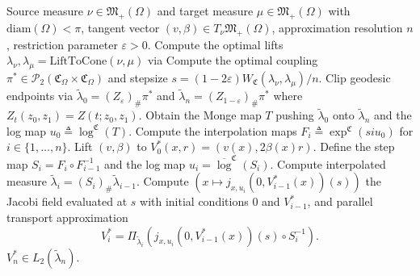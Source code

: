 \documentclass[11pt]{article}
\begin{document}
\begin{algorithm}[h]
    \begin{algorithmic}[1]
        \caption{Approximate Parallel transport on $(\mathfrak{M}_+(\Omega), \text{HK})$}
        \label{alg: HK parallel transport}
        \Require Source measure $\nu \in \mathfrak{M}_+(\Omega)$ and target measure $\mu \in \mathfrak{M}_+(\Omega)$ with $\text{diam}(\Omega) < \pi$, tangent vector $(v, \beta) \in T_{\nu}\mathfrak{M}_+(\Omega)$, approximation resolution $n$, restriction parameter $\varepsilon >0$.  
        \State Compute the optimal lifts $\lambda_{\nu}, \lambda_{\mu} = \text{LiftToCone}(\nu, \mu)$ via 
        \State Compute the optimal coupling $\pi^* \in \mathcal{P}_2(\mathfrak{C}_{\Omega} \times \mathfrak{C}_{\Omega})$ and stepsize $s = (1-2\varepsilon)W_\mathfrak{C}(\lambda_\nu, \lambda_\mu)/n.$
        \State Clip geodesic endpoints via $\tilde{\lambda}_0 = (Z_{\varepsilon})_{\#}\pi^*$ and $\tilde{\lambda}_n = (Z_{1 - \varepsilon})_{\#}\pi^*$ where $Z_t(z_0, z_1) = Z(t; z_0, z_1)$. 
        \State Obtain the Monge map $T$ pushing $\tilde \lambda_0$ onto $\tilde \lambda_n$ and the log map $u_0 \triangleq \log^{\mathfrak{C}}(T)$.
        \State Compute the interpolation maps $F_i \triangleq \exp^{\mathfrak{C}}(si u_0)$ for $i \in \{1, \dots, n\}$.
        \State Lift $(v, \beta)$ to $V^*_0(x,r) = \left(v(x), 2\beta(x)r\right)$. 
            \State Define the step map $S_i = F_{i} \circ F_{i-1}^{-1}$ and the log map $u_i = \overline{\log}^\mathfrak{C}(S_i)$.
            \State Compute interpolated measure $\tilde{\lambda}_i = (S_i)_\#\tilde \lambda_{i-1}$.
            \State Compute $\left(x \mapsto j_{x, u_i}(0, V_{i-1}^*(x))(s)\right)$ the Jacobi field evaluated at $s$ with initial conditions $0$ \hspace*{\algorithmicindent}and $V^*_{i-1}$, and parallel transport approximation
            \[V_{i}^* = \Pi_{\tilde\lambda_i}\left(j_{x, u_i}(0, V_{i-1}^*(x))(s) \circ S_i^{-1}\right).\]
        \EndFor
        \State \Return $V^*_{n} \in L_2(\tilde\lambda_n)$. 
    \end{algorithmic}
\end{algorithm}

\end{document}

